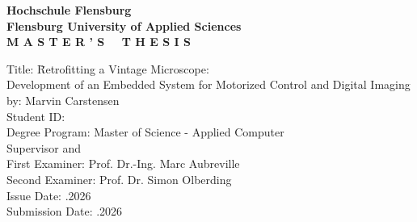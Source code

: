 \begin{center}
    \textbf{Hochschule Flensburg}\\
    \textbf{Flensburg University of Applied Sciences}\\
    \vspace{2cm}
    \textbf{\LARGE M A S T E R ' S \ \ T H E S I S}
\end{center}

\vspace{2cm}


\begin{tabbing}
    Title: \hspace{2cm} \= Retrofitting a Vintage Microscope:\\[0.5cm]
    \> Development of an Embedded System for Motorized Control and Digital Imaging \\[0.5cm]
    by: \> Marvin Carstensen\\[2cm]
    Student ID:  \\[0.5cm]
    Degree Program: \> Master of Science - Applied Computer  \\[0.5cm]
    Supervisor and \\
    First Examiner: \>Prof. Dr.-Ing. Marc Aubreville \\[0.5cm]
    Second Examiner: \>Prof. Dr. Simon Olberding \\[0.5cm]
    Issue Date: .2026 \\[0.5cm]
    Submission Date: .2026
\end{tabbing}
